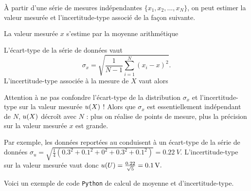 À partir d'une série de mesures indépendantes $\{x_1,x_2,...,x_N\}$, on peut estimer la valeur mesurée et l’incertitude-type associé de la façon suivante.
\begin{liste}
\item La valeur mesurée $x$ s’estime par la moyenne arithmétique
\item L’écart-type de la série de données vaut
\begin{equation}\label{eq:deltax}
\sigma_x = \sqrt{\frac{1}{N-1} \sum_{i=1}^N (x_i-x)^2}.
\end{equation}
L’incertitude-type associée à la mesure de $X$ vaut alors
\begin{danger}
Attention à ne pas confondre l’écart-type de la distribution $\sigma_x$ et  l’incertitude-type sur la valeur mesurée $\incertX x$ ! Alors que $\sigma_x$ est essentiellement indépendant de $N$, $\incertX x$ décroît avec $N$ : plus on réalise de points de mesure, plus la précision sur la valeur mesurée $x$ est grande.
\end{danger}
\begin{remarque}
Par exemple, les données reportées au  conduisent à un écart-type de la série de données
$\sigma_u = \sqrt{\frac{1}{4}(\num{0.3}^2+\num{0.1}^2+\num{0}^2+\num{0.3}^2+\num{0.1}^2)}=\SI{0.22}{V}.$
L’incertitude-type sur la valeur mesurée vaut donc
$
\incertX u = \frac{\num{0.22}}{\sqrt{5}} = \SI{0.1}{V}.
$
\end{remarque}
\end{liste}

\noindent Voici un exemple de code \texttt{Python} de calcul de moyenne et d’incertitude-type.

\inputminted{python}{moy_incertitude.py}


